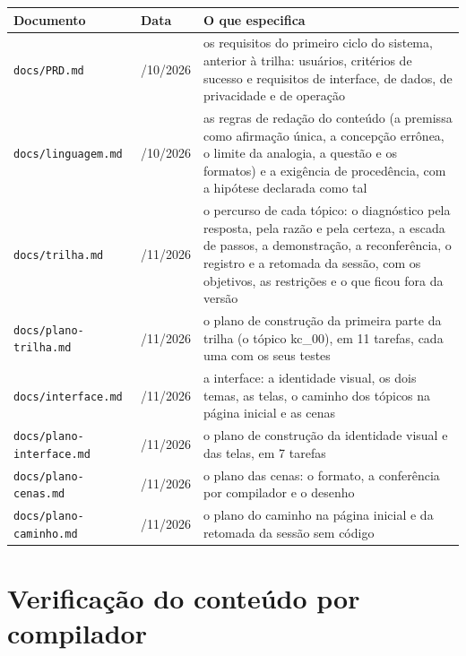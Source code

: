 \begin{quadro}[htbp]
\caption{Documentos de especificação do sistema}\label{qua:5-1}
\footnotesize
\begin{tabularx}{\textwidth}{|X|>{\centering\arraybackslash}p{2.6cm}|X|}
\hline
\textbf{Documento} & \textbf{Data} & \textbf{O que especifica} \\ \hline
\texttt{docs/PRD.md} & 28/10/2026 & os requisitos do primeiro ciclo do sistema, anterior à trilha: usuários, critérios de sucesso e requisitos de interface, de dados, de privacidade e de operação \\ \hline
\texttt{docs/\allowbreak{}linguagem.\allowbreak{}md} & 29/10/2026 & as regras de redação do conteúdo (a premissa como afirmação única, a concepção errônea, o limite da analogia, a questão e os formatos) e a exigência de procedência, com a hipótese declarada como tal \\ \hline
\texttt{docs/trilha.md} & 13/11/2026 & o percurso de cada tópico: o diagnóstico pela resposta, pela razão e pela certeza, a escada de passos, a demonstração, a reconferência, o registro e a retomada da sessão, com os objetivos, as restrições e o que ficou fora da versão \\ \hline
\texttt{docs/\allowbreak{}plano-{}trilha.\allowbreak{}md} & 13/11/2026 & o plano de construção da primeira parte da trilha (o tópico kc\_00), em 11 tarefas, cada uma com os seus testes \\ \hline
\texttt{docs/\allowbreak{}interface.\allowbreak{}md} & 14/11/2026 & a interface: a identidade visual, os dois temas, as telas, o caminho dos tópicos na página inicial e as cenas \\ \hline
\texttt{docs/\allowbreak{}plano-{}interface.\allowbreak{}md} & 16/11/2026 & o plano de construção da identidade visual e das telas, em 7 tarefas \\ \hline
\texttt{docs/\allowbreak{}plano-{}cenas.\allowbreak{}md} & 18/11/2026 & o plano das cenas: o formato, a conferência por compilador e o desenho \\ \hline
\texttt{docs/\allowbreak{}plano-{}caminho.\allowbreak{}md} & 18/11/2026 & o plano do caminho na página inicial e da retomada da sessão sem código \\ \hline
\end{tabularx}
\end{quadro}

\section{Verificação do conteúdo por compilador}

